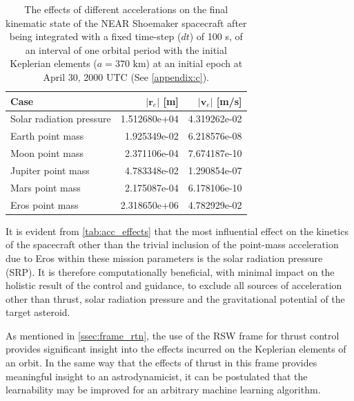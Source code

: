 \begin{table}
    \caption{
        The effects of different accelerations on the final kinematic state of
        the NEAR Shoemaker spacecraft \textmd{after being integrated with a
        fixed time-step ($dt$) of 100 s, of an interval of one orbital period
        with the initial Keplerian elements ($a=370\textrm{ km}$) at an initial
        epoch at April 30, 2000 UTC (See \autoref{appendix:c}).}
    }
    \centering
    \label{tab:acc_effects}
    \begin{tabular}{lrr}

        Case                     & $|\mathbf{r}_{e}|$ [m] & $|\mathbf{v}_{e}|$ [m/s] \\
        \hline\hline
        Solar radiation pressure & 1.512680e+04           & 4.319262e-02             \\
        Earth point mass         & 1.925349e-02           & 6.218576e-08             \\
        Moon point mass          & 2.371106e-04           & 7.674187e-10             \\
        Jupiter point mass       & 4.783348e-02           & 1.290854e-07             \\
        Mars point mass          & 2.175087e-04           & 6.178106e-10             \\
        Eros point mass          & 2.318650e+06           & 4.782929e-02             \\

    \end{tabular}
\end{table}

It is evident from \autoref{tab:acc_effects} that the most influential effect on
the kinetics of the spacecraft other than the trivial inclusion of the
point-mass acceleration due to Eros within these mission parameters is the solar
radiation pressure (SRP). It is therefore computationally beneficial, with
minimal impact on the holistic result of the control and guidance, to exclude
all sources of acceleration other than thrust, solar radiation pressure and the
gravitational potential of the target asteroid.

As mentioned in \autoref{ssec:frame_rtn}, the use of the RSW frame for thrust
control provides significant insight into the effects incurred on the Keplerian
elements of an orbit. In the same way that the effects of thrust in this frame
provides meaningful insight to an astrodynamicist, it can be postulated that the
learnability may be improved for an arbitrary machine learning algorithm.

